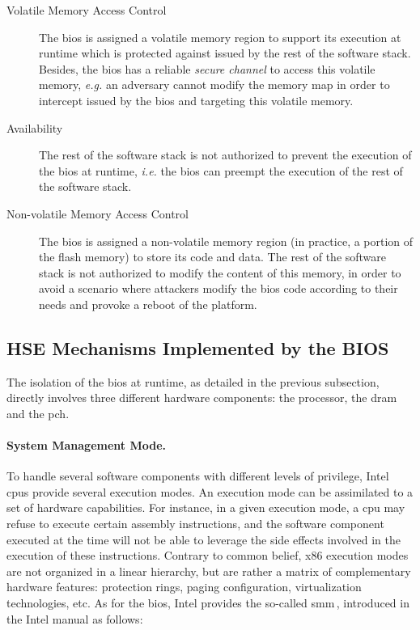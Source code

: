 \begin{description}
\item [Volatile Memory Access Control]
  The \ac{bios} is assigned a volatile memory region to support its execution at
  runtime which is protected against \IOs issued by the rest of the software
  stack.
  Besides, the \ac{bios} has a reliable \emph{secure channel}  to
  access this volatile memory, \emph{e.g.} an adversary cannot modify the memory
  map in order to intercept \IOs issued by the \ac{bios} and targeting this
  volatile memory.
\item [Availability]
  The rest of the software stack is not authorized to prevent the execution of
  the \ac{bios} at runtime, \emph{i.e.} the \ac{bios} can preempt the execution
  of the rest of the software stack.
\item [Non-volatile Memory Access Control]
  The \ac{bios} is assigned a non-volatile memory region (in practice, a portion
  of the flash memory) to store its code and data.
  The rest of the software stack is not authorized to modify the content of this
  memory, in order to avoid a scenario where attackers modify the \ac{bios} code
  according to their needs and provoke a reboot of the platform.
\end{description}

\subsection{HSE Mechanisms Implemented by the BIOS}
\label{subsec:usecase:hse:smm}

The isolation of the \ac{bios} at runtime, as detailed in the previous
subsection, directly involves three different hardware components: the
processor, the \ac{dram} and the \ac{pch}.

\paragraph{System Management Mode.}
%
To handle several software components with different levels of privilege, Intel
\acp{cpu} provide several execution modes.
%
An execution mode can be assimilated to a set of hardware capabilities.
%
For instance, in a given execution mode, a \ac{cpu} may refuse to execute
certain assembly instructions, and the software component executed at the time
will not be able to leverage the side effects involved in the execution of these
instructions.
%
Contrary to common belief, x86 execution modes are not organized in a linear
hierarchy, but are rather a matrix of complementary hardware features:
protection rings, paging configuration, virtualization technologies, etc.
%
As for the \ac{bios}, Intel provides the so-called \ac{smm}\,\cite[Volume 3,
Chapter 34]{intel2014manual}, introduced in the Intel manual as follows:

